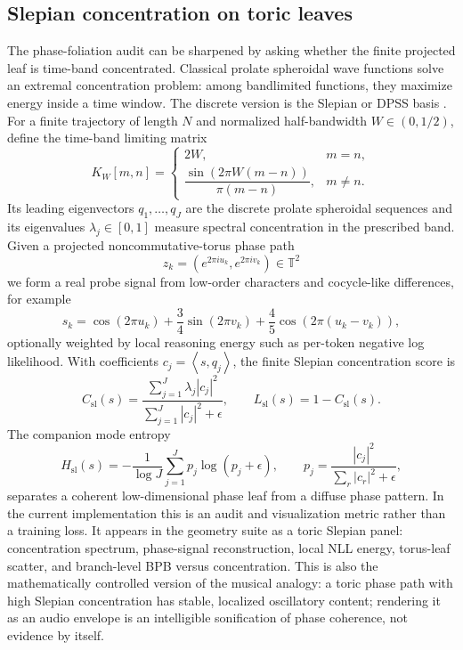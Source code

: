 \documentclass[11pt]{article}
\theoremstyle{definition}
\theoremstyle{plain}
\theoremstyle{remark}
\numberwithin{equation}{section}
\newcommand{\ip}[2]{\left\langle #1,#2\right\rangle}
\begin{document}
\subsection{Slepian concentration on toric leaves}

The phase-foliation audit can be sharpened by asking whether the finite projected leaf is time-band concentrated.  Classical prolate spheroidal wave functions solve an extremal concentration problem: among bandlimited functions, they maximize energy inside a time window.  The discrete version is the Slepian or DPSS basis \cite{slepian1978prolate}.  For a finite trajectory of length $N$ and normalized half-bandwidth $W\in(0,1/2)$, define the time-band limiting matrix
\begin{equation}
  K_W[m,n]=
  \begin{cases}
    2W, & m=n,\\[0.35em]
    \dfrac{\sin(2\pi W(m-n))}{\pi(m-n)}, & m\ne n.
  \end{cases}
\end{equation}
Its leading eigenvectors $q_1,\ldots,q_J$ are the discrete prolate spheroidal sequences and its eigenvalues $\lambda_j\in[0,1]$ measure spectral concentration in the prescribed band.  Given a projected noncommutative-torus phase path
\begin{equation}
  z_k=\left(e^{2\pi i u_k},e^{2\pi i v_k}\right)\in\mathbb T^2
\end{equation}
we form a real probe signal from low-order characters and cocycle-like differences, for example
\begin{equation}
  s_k=\cos(2\pi u_k)+\frac34\sin(2\pi v_k)+\frac45\cos(2\pi(u_k-v_k)),
\end{equation}
optionally weighted by local reasoning energy such as per-token negative log likelihood.  With coefficients $c_j=\ip{s}{q_j}$, the finite Slepian concentration score is
\begin{equation}
  C_{\mathrm{sl}}(s)=
  \frac{\sum_{j=1}^J\lambda_j |c_j|^2}{\sum_{j=1}^J |c_j|^2+\epsilon},
  \qquad
  L_{\mathrm{sl}}(s)=1-C_{\mathrm{sl}}(s).
\end{equation}
The companion mode entropy
\begin{equation}
  H_{\mathrm{sl}}(s)=
  -\frac{1}{\log J}\sum_{j=1}^J p_j\log(p_j+\epsilon),
  \qquad p_j=\frac{|c_j|^2}{\sum_r |c_r|^2+\epsilon},
\end{equation}
separates a coherent low-dimensional phase leaf from a diffuse phase pattern.  In the current implementation this is an audit and visualization metric rather than a training loss.  It appears in the geometry suite as a toric Slepian panel: concentration spectrum, phase-signal reconstruction, local NLL energy, torus-leaf scatter, and branch-level BPB versus concentration.  This is also the mathematically controlled version of the musical analogy: a toric phase path with high Slepian concentration has stable, localized oscillatory content; rendering it as an audio envelope is an intelligible sonification of phase coherence, not evidence by itself.
\end{document}
